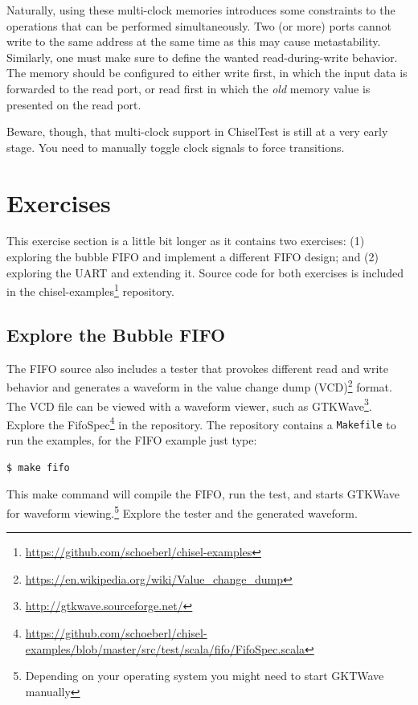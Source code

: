 \documentclass[%
    10pt,
    headinclude, footexclude,
    openright, %
    notitlepage,
    cleardoubleempty,
    headsepline,
    pointlessnumbers,
    bibtotoc, idxtotoc,
    ]{scrbook}
\newcommand{\code}[1]{{\small{\texttt{#1}}}}
\newcommand{\myref}[2]{\href{#1}{#2}}
\renewcommand{\myref}[2]{{#2}{\footnote{\url{#1}}}}
\begin{document}

Naturally, using these multi-clock memories introduces some constraints to the
operations that can be performed simultaneously. Two (or more) ports cannot
write to the same address at the same time as this may cause metastability.
Similarly, one must make sure to define the wanted read-during-write behavior.
The memory should be configured to either write first, in which the input data is
forwarded to the read port, or read first in which the \emph{old} memory value
is presented on the read port.

Beware, though, that multi-clock support in ChiselTest is still at a very early
stage. You need to manually toggle clock signals to force transitions.


\section{Exercises}

This exercise section is a little bit longer as it contains two exercises:
(1) exploring the bubble FIFO and implement a different FIFO design;
and (2) exploring the UART and extending it.
Source code for both exercises is included in the
\myref{https://github.com/schoeberl/chisel-examples}{chisel-examples} repository.

\subsection{Explore the Bubble FIFO}

The FIFO source also includes a tester that provokes different read and write behavior and generates a waveform in the
\myref{https://en.wikipedia.org/wiki/Value_change_dump}{value change dump (VCD)} format.
The VCD file can be viewed with a waveform viewer, such as
\myref{http://gtkwave.sourceforge.net/}{GTKWave}.
Explore the
\myref{https://github.com/schoeberl/chisel-examples/blob/master/src/test/scala/fifo/FifoSpec.scala}{FifoSpec} in the repository.
The repository contains a \code{Makefile} to run the examples, for the FIFO example
just type:
\begin{verbatim}
$ make fifo
\end{verbatim}
This make command will compile the FIFO, run the test, and starts GTKWave for waveform
viewing.\footnote{Depending on your operating system you might need to start GKTWave
manually} Explore the tester and the generated waveform.
\end{document}
